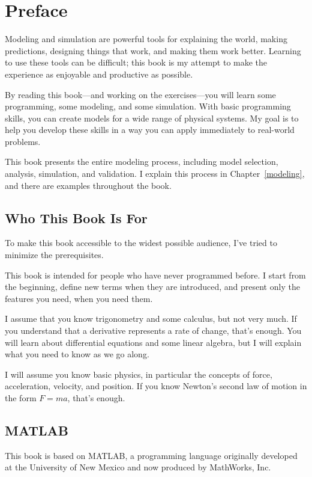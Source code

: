 
\chapter*{Preface}

Modeling and simulation are powerful tools for explaining the world, making predictions, designing things that work, and making them work better.  Learning to use these tools can be difficult; this book is my attempt to make the experience as enjoyable and productive as possible.

By reading this book---and working on the exercises---you will learn some programming, some modeling, and some simulation.
With basic programming skills, you can create models for a wide range of physical systems.
My goal is to help you develop these skills in a way you can apply immediately to real-world problems.

This book presents the entire modeling process, including model selection, analysis, simulation, and validation.  I explain this process in Chapter~\ref{modeling}, and there are examples throughout the book.

\section*{Who This Book Is For}

To make this book accessible to the widest possible audience, I've tried to minimize the prerequisites.

This book is intended for people who have never programmed before.  I start from the beginning, define new terms when they are introduced, and present only the features you need, when you need them.

I assume that you know trigonometry and some calculus, but not very much.  If you understand that a derivative represents a rate of change, that's enough.  You will learn about differential equations and some linear algebra, but I will explain what you need to know as we go along.

I will assume you know basic physics, in particular the concepts of force, acceleration, velocity, and position.  If you know Newton's second law of motion in the form $F = m a$, that's enough.


\section*{MATLAB}

This book is based on MATLAB, a programming language originally developed at the University of New Mexico and now produced by MathWorks, Inc.

